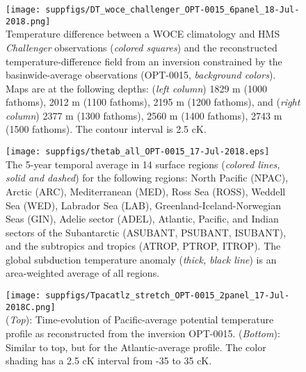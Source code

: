 \documentclass[12pt]{article}
\begin{document}
\begin{figure}%
\begin{center}
\texttt{[image: suppfigs/DT\_woce\_challenger\_OPT-0015\_6panel\_18-Jul-2018.png]}\\
 Temperature difference between a WOCE climatology
\cite{Gouretski-Koltermann-2004:WOCE} and HMS {\it Challenger}
observations ({\it colored squares}) and the reconstructed
temperature-difference field from an inversion constrained by the
basinwide-average observations (OPT-0015, {\it background
  colors}). Maps are at the following depths: ({\it left column})
1829 m (1000 fathoms), 2012 m (1100 fathoms), 2195 m (1200 fathoms), and ({\it right column}) 2377 m (1300 fathoms),  2560 m (1400 fathoms), 2743 m (1500 fathoms). The contour interval is 2.5 cK.
\end{center} 
\end{figure}


\begin{figure}%
\begin{center}
\texttt{[image: suppfigs/thetab\_all\_OPT-0015\_17-Jul-2018.eps]}\\
 The 5-year temporal
average in 14 surface regions ({\it colored lines, solid and dashed})
for the following regions: North Pacific (NPAC), Arctic (ARC),
Mediterranean (MED), Ross Sea (ROSS), Weddell Sea (WED), Labrador Sea
(LAB), Greenland-Iceland-Norwegian Seas (GIN), Adelie sector (ADEL),
Atlantic, Pacific, and Indian sectors of the Subantarctic (ASUBANT,
PSUBANT, ISUBANT), and the subtropics and tropics (ATROP, PTROP,
ITROP). The global subduction temperature anomaly ({\it thick, black
  line}) is an area-weighted average of all regions.
\end{center} 
\end{figure}

\begin{figure}%
\begin{center}
\texttt{[image: suppfigs/Tpacatlz\_stretch\_OPT-0015\_2panel\_17-Jul-2018C.png]}\\
 ({\it Top}): Time-evolution of
Pacific-average potential temperature profile as reconstructed from
the inversion OPT-0015.
({\it Bottom}): Similar to top, but for the Atlantic-average profile. The color shading has a 2.5 cK interval from -35 to 35 cK. \\
\end{center} 
\end{figure}
\end{document}
